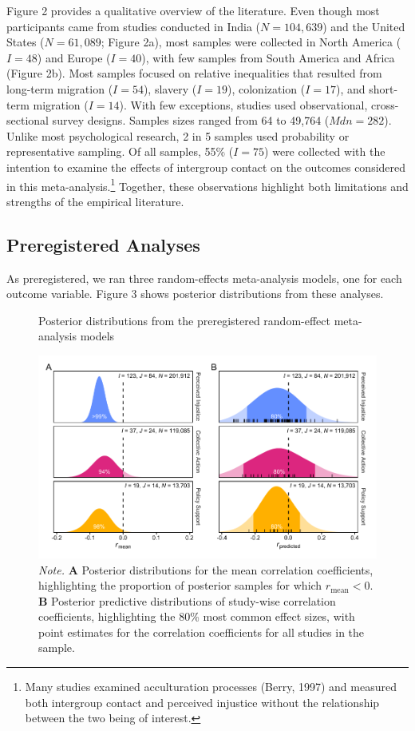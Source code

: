 \documentclass[twocolumn, 11pt, letterpaper]{article}
\begin{document}
Figure 2 provides a qualitative overview of the literature. Even though
most participants came from studies conducted in India (\(N = 104,639\))
and the United States (\(N = 61,089\); Figure 2a), most samples were
collected in North America (\(I = 48\)) and Europe (\(I = 40\)), with
few samples from South America and Africa (Figure 2b). Most samples
focused on relative inequalities that resulted from long-term migration
(\(I = 54\)), slavery (\(I = 19\)), colonization (\(I = 17\)), and
short-term migration (\(I = 14\)). With few exceptions, studies used
observational, cross-sectional survey designs. Samples sizes ranged from
64 to 49,764 (\(\textit{Mdn} = 282\)). Unlike most psychological
research, 2 in 5 samples used probability or representative sampling. Of
all samples, 55\% (\(I = 75\)) were collected with the intention to
examine the effects of intergroup contact on the outcomes considered in
this meta-analysis.\footnote{Many studies examined acculturation
  processes (Berry, 1997) and measured both intergroup contact and
  perceived injustice without the relationship between the two being of
  interest.} Together, these observations highlight both limitations and
strengths of the empirical literature.

\hypertarget{preregistered-analyses-1}{%
\subsection{Preregistered Analyses}\label{preregistered-analyses-1}}

As preregistered, we ran three random-effects meta-analysis models, one
for each outcome variable. Figure 3 shows posterior distributions from
these analyses.

\begin{figure}[!t]
\centering
\caption{Posterior distributions from the preregistered random-effect meta-analysis models}
\includegraphics[scale=1]{../figures/figure-3}
\caption*{\textit{Note.} \textbf{A} Posterior distributions for the mean correlation coefficients, highlighting the proportion of posterior samples for which $r_\text{mean} < 0$. \textbf{B} Posterior predictive distributions of study-wise correlation coefficients, highlighting the 80\% most common effect sizes, with point estimates for the correlation coefficients for all studies in the sample.}
\label{fig:f3}
\end{figure}
\end{document}
